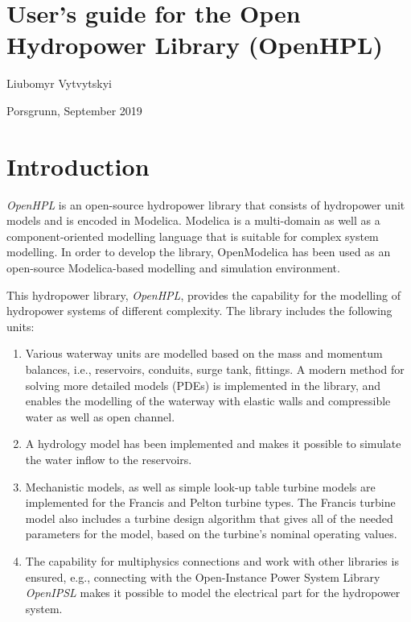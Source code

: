\documentclass[%
]{USN-PhD}
\begin{document}
\chapter*{User's guide for the Open Hydropower Library (OpenHPL)}

Liubomyr Vytvytskyi

Porsgrunn,  September 2019

\tableofcontents

\chapter{Introduction}

\emph{OpenHPL} is an open-source hydropower library that consists of hydropower unit models and is encoded in Modelica. Modelica is a multi-domain as well as a component-oriented modelling language that is suitable for complex system modelling. In order to develop the library, OpenModelica has been used as an open-source Modelica-based modelling and simulation environment.

This hydropower library, \emph{OpenHPL}, provides the capability for the modelling of hydropower systems of different complexity. The library includes the following units:
\begin{enumerate}
\item Various waterway units are modelled based on the mass and momentum balances, i.e., reservoirs, conduits, surge tank, fittings. A modern method for solving more detailed models (PDEs) is implemented in the library, and enables the modelling of the waterway with elastic walls and compressible water as well as open channel.
\item A hydrology model has been implemented and makes it possible to simulate the water inflow to the reservoirs.
\item Mechanistic models, as well as simple look-up table turbine models are implemented for the Francis and Pelton turbine types. The Francis turbine model also includes a turbine design algorithm that gives all of the needed parameters for the model, based on the turbine's nominal operating values.
\item The capability for multiphysics connections and work with other libraries is ensured, e.g., connecting with the Open-Instance Power System Library \emph{OpenIPSL} makes it possible to model the electrical part for the hydropower system.
\end{enumerate}
\end{document}
